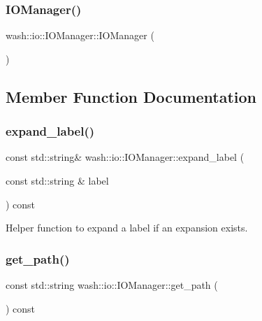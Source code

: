 \subsubsection{\texorpdfstring{I\+O\+Manager()}{IOManager()}\hspace{0.1cm}{\footnotesize\ttfamily [4/4]}}
{\footnotesize\ttfamily wash\+::io\+::\+I\+O\+Manager\+::\+I\+O\+Manager (\begin{DoxyParamCaption}{ }\end{DoxyParamCaption})}



\subsection{Member Function Documentation}
\mbox{\label{classwash_1_1io_1_1IOManager_ac0942e50fcd001ef853c8eb6b107e92d}} 
\subsubsection{\texorpdfstring{expand\+\_\+label()}{expand\_label()}}
{\footnotesize\ttfamily const std\+::string\& wash\+::io\+::\+I\+O\+Manager\+::expand\+\_\+label (\begin{DoxyParamCaption}\item[{const std\+::string \&}]{label }\end{DoxyParamCaption}) const\hspace{0.3cm}{\ttfamily [inline]}}



Helper function to expand a label if an expansion exists. 

\mbox{\label{classwash_1_1io_1_1IOManager_aded7d1dbc7a4c2fc21e3a914ea0ea3b0}} 
\subsubsection{\texorpdfstring{get\+\_\+path()}{get\_path()}}
{\footnotesize\ttfamily const std\+::string wash\+::io\+::\+I\+O\+Manager\+::get\+\_\+path (\begin{DoxyParamCaption}{ }\end{DoxyParamCaption}) const\hspace{0.3cm}{\ttfamily [inline]}}


